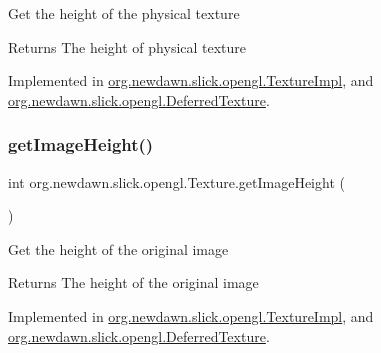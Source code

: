 Get the height of the physical texture

\begin{DoxyReturn}{Returns}
The height of physical texture 
\end{DoxyReturn}


Implemented in \mbox{\hyperlink{classorg_1_1newdawn_1_1slick_1_1opengl_1_1_texture_impl_a116a321d3df28cc159044c41b4f463ea}{org.\+newdawn.\+slick.\+opengl.\+Texture\+Impl}}, and \mbox{\hyperlink{classorg_1_1newdawn_1_1slick_1_1opengl_1_1_deferred_texture_ab934e107804aa927cc4bdc90212f7e1f}{org.\+newdawn.\+slick.\+opengl.\+Deferred\+Texture}}.

\mbox{\label{interfaceorg_1_1newdawn_1_1slick_1_1opengl_1_1_texture_afe73affbe5e20e047f6364ce7b61d7d2}} 
\subsubsection{\texorpdfstring{get\+Image\+Height()}{getImageHeight()}}
{\footnotesize\ttfamily int org.\+newdawn.\+slick.\+opengl.\+Texture.\+get\+Image\+Height (\begin{DoxyParamCaption}{ }\end{DoxyParamCaption})}

Get the height of the original image

\begin{DoxyReturn}{Returns}
The height of the original image 
\end{DoxyReturn}


Implemented in \mbox{\hyperlink{classorg_1_1newdawn_1_1slick_1_1opengl_1_1_texture_impl_a377019eb21fcdf1d9eb340b6ca3cca12}{org.\+newdawn.\+slick.\+opengl.\+Texture\+Impl}}, and \mbox{\hyperlink{classorg_1_1newdawn_1_1slick_1_1opengl_1_1_deferred_texture_a65cba14cf7d1cd94354f6031dd609634}{org.\+newdawn.\+slick.\+opengl.\+Deferred\+Texture}}.

\mbox{\label{interfaceorg_1_1newdawn_1_1slick_1_1opengl_1_1_texture_a7dadcef354aaed97a0fe03f1978ee5f8}} 
